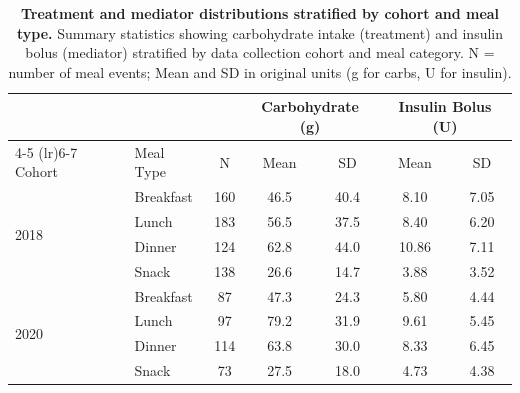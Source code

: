 \begin{table}[ht]
\centering
\small
\caption{\textbf{Treatment and mediator distributions stratified by cohort and meal type.}
Summary statistics showing carbohydrate intake (treatment) and insulin bolus (mediator)
stratified by data collection cohort and meal category.
N = number of meal events; Mean and SD in original units (g for carbs, U for insulin).}
\label{tab:stratified_cohort_meal}
\begin{tabular}{llccccc}
\toprule
& & & \multicolumn{2}{c}{Carbohydrate (g)} & \multicolumn{2}{c}{Insulin Bolus (U)} \\
\cmidrule(lr){4-5} \cmidrule(lr){6-7}
Cohort & Meal Type & N & Mean & SD & Mean & SD \\
\midrule
\multirow{4}{*}{2018} & Breakfast & 160 & 46.5 & 40.4 & 8.10 & 7.05 \\
 & Lunch & 183 & 56.5 & 37.5 & 8.40 & 6.20 \\
 & Dinner & 124 & 62.8 & 44.0 & 10.86 & 7.11 \\
 & Snack & 138 & 26.6 & 14.7 & 3.88 & 3.52 \\
\midrule
\multirow{4}{*}{2020} & Breakfast & 87 & 47.3 & 24.3 & 5.80 & 4.44 \\
 & Lunch & 97 & 79.2 & 31.9 & 9.61 & 5.45 \\
 & Dinner & 114 & 63.8 & 30.0 & 8.33 & 6.45 \\
 & Snack & 73 & 27.5 & 18.0 & 4.73 & 4.38 \\
\bottomrule
\end{tabular}
\end{table}
